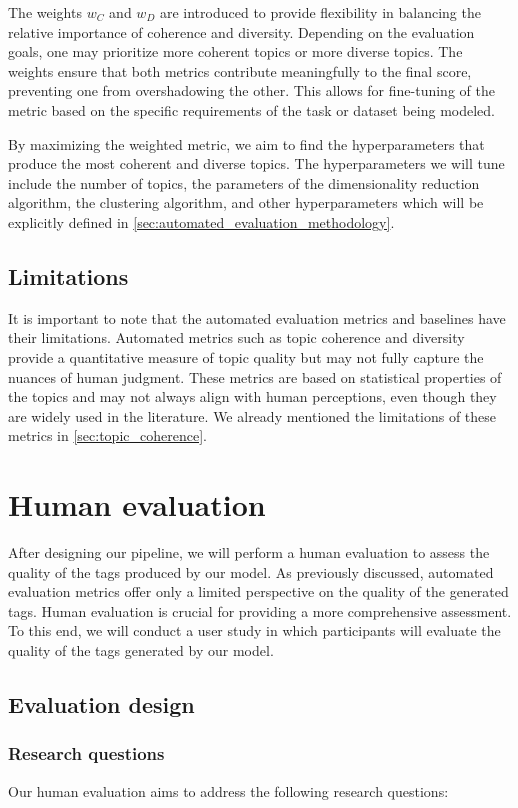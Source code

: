 The weights \( w_C \) and \( w_D \) are introduced to provide flexibility in balancing the relative importance of coherence and diversity. Depending on the evaluation goals, one may prioritize more coherent topics or more diverse topics. The weights ensure that both metrics contribute meaningfully to the final score, preventing one from overshadowing the other. This allows for fine-tuning of the metric based on the specific requirements of the task or dataset being modeled.

By maximizing the weighted metric, we aim to find the hyperparameters that produce the most coherent and diverse topics. The hyperparameters we will tune include the number of topics, the parameters of the dimensionality reduction algorithm, the clustering algorithm, and other hyperparameters which will be explicitly defined in \cref{sec:automated_evaluation_methodology}.

\subsection{Limitations}
It is important to note that the automated evaluation metrics and baselines have their limitations. Automated metrics such as topic coherence and diversity provide a quantitative measure of topic quality but may not fully capture the nuances of human judgment. These metrics are based on statistical properties of the topics and may not always align with human perceptions, even though they are widely used in the literature. We already mentioned the limitations of these metrics in \cref{sec:topic_coherence}.

\section{Human evaluation}
\label{sec:human_evaluation}
After designing our pipeline, we will perform a human evaluation to assess the quality of the tags produced by our model. As previously discussed, automated evaluation metrics offer only a limited perspective on the quality of the generated tags. Human evaluation is crucial for providing a more comprehensive assessment. To this end, we will conduct a user study in which participants will evaluate the quality of the tags generated by our model.

\subsection{Evaluation design}
\subsubsection{Research questions}
Our human evaluation aims to address the following research questions:

